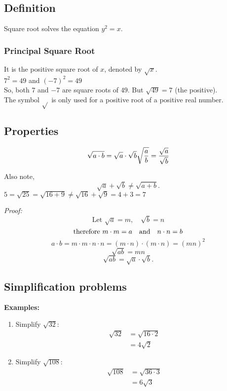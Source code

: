 \documentclass{hw}
\begin{document}
\subsection*{Definition}
Square root solves the equation $y^2 = x$.

\subsubsection*{\normalsize Principal Square Root}
It is the positive square root of $x$, denoted by $\sqrt{x}$. \\
$7^2 = 49$ \quad and \quad $(-7)^2 = 49$ \\
So, both $7$ and $-7$ are square roots of $49$. But $\sqrt{49} = 7$ (the positive).\\
The symbol $\sqrt{}$ is only used for a positive root of a positive real number.

\subsection*{\normalsize Properties}
\[
\sqrt{a \cdot b} = \sqrt{a} \cdot \sqrt{b} \\
\sqrt{\frac{a}{b}} = \frac{\sqrt{a}}{\sqrt{b}}
\]

Also note,
\[
\sqrt{a} + \sqrt{b} \neq \sqrt{a + b}.
\]
$5 = \sqrt{25} = \sqrt{16 + 9} \neq \sqrt{16} + \sqrt{9} = 4 + 3 = 7$

\emph{Proof:}
\[
\text{Let } \sqrt{a} = m, \quad \sqrt{b} = n
\]
\[
\text{therefore \em} m \cdot m = a \quad \text{and} \quad n \cdot n = b
\]
\[
a \cdot b = m \cdot m \cdot n \cdot n = (m \cdot n) \cdot (m \cdot n) = (m n)^2
\]
\[
\sqrt{a b} = m n
\]
\[
\sqrt{a b} = \sqrt{a} \cdot \sqrt{b}.
\]

\subsection*{\normalsize Simplification problems}
\textbf{Examples:}
\begin{enumerate}[label=\alph*.]
    \item Simplify $\sqrt{32}$:
        \begin{align*}
            \sqrt{32} &= \sqrt{16 \cdot 2} \\
                      &= 4\sqrt{2}
        \end{align*}
    \item Simplify $\sqrt{108}$:
        \begin{align*}
            \sqrt{108} &= \sqrt{36 \cdot 3} \\
                       &= 6\sqrt{3}
        \end{align*}
\end{enumerate}
\end{document}
